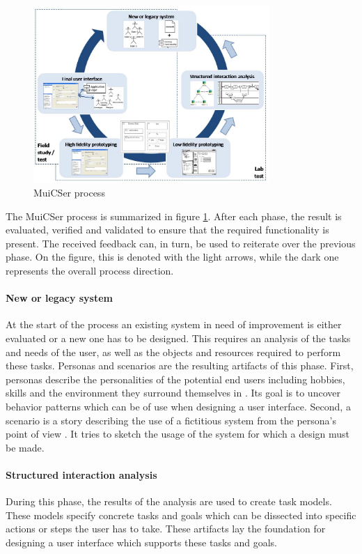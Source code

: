         \begin{figure}[!t]
            \centering
            \includegraphics[width=0.8\textwidth]{chapters/2_background/muicser}
            \caption{MuiCSer process}\label{fig:muicser}
        \end{figure}

        The MuiCSer process is summarized in figure \ref{fig:muicser}. After each phase, the result is evaluated, verified and validated to ensure that the required functionality is present. The received feedback can, in turn, be used to reiterate over the previous phase. On the figure, this is denoted with the light arrows, while the dark one represents the overall process direction.

        \paragraph{New or legacy system} At the start of the process an existing system in need of improvement is either evaluated or a new one has to be designed. This requires an analysis of the tasks and needs of the user, as well as the objects and resources required to perform these tasks. Personas and scenarios are the resulting artifacts of this phase. First, personas describe the personalities of the potential end users including hobbies, skills and the environment they surround themselves in \cite{persona_scenario}. Its goal is to uncover behavior patterns which can be of use when designing a user interface. Second, a scenario is a story describing the use of a fictitious system from the persona's point of view \cite{persona_scenario}. It tries to sketch the usage of the system for which a design must be made.

        \paragraph{Structured interaction analysis} During this phase, the results of the analysis are used to create task models. These models specify concrete tasks and goals which can be dissected into specific actions or steps the user has to take. These artifacts lay the foundation for designing a user interface which supports these tasks and goals.

